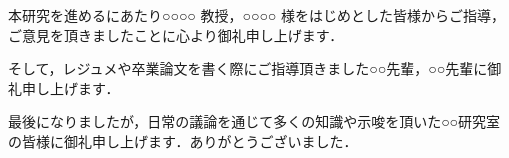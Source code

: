 \theacknowledgments


\begin{comment}
    \textblockcolour{lime}
    \begin{textblock}{12}(6, 6)
        謝辞はなくてもよい。
        
        謝辞・参考文献・ソースコードなどの付録は本文に含まれない。
    \end{textblock}
    
    \begin{textblock}{12}(6, 12)
        論文全体で句読点の形式を統一する。
    
        このサンプルでは謝辞の句読点が他の章のそれと異なっている。
    
        どの句読点形式で執筆をするか指導教員に確認すること。
    \end{textblock}
\end{comment}

本研究を進めるにあたり○○○○ 教授，○○○○ 様をはじめとした皆様からご指導，ご意見を頂きましたことに心より御礼申し上げます．

そして，レジュメや卒業論文を書く際にご指導頂きました○○先輩，○○先輩に御礼申し上げます．

最後になりましたが，日常の議論を通じて多くの知識や示唆を頂いた○○研究室の皆様に御礼申し上げます．ありがとうございました．
